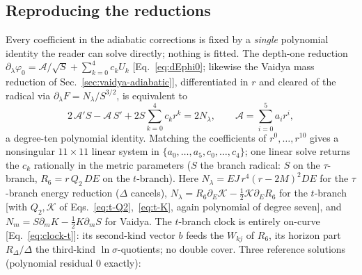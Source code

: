 \documentclass[
    aps, prd, twocolumn, superscriptaddress,
    showpacs, nofootinbib, floatfix
]{revtex4-2}
\begin{document}
\subsection{Reproducing the reductions}
\label{app:reproduce}
Every coefficient in the adiabatic corrections is fixed by a \emph{single}
polynomial identity the reader can solve directly; nothing is fitted. The depth-one
reduction $\partial_\lambda\varphi_0=\mathcal{A}/\sqrt S+\sum_{k=0}^4 c_k U_k$
[Eq.~\eqref{eq:dEphi0}; likewise the Vaidya mass reduction of
Sec.~\ref{sec:vaidya-adiabatic}], differentiated in $r$ and cleared of the radical
via $\partial_\lambda F=N_\lambda/S^{3/2}$, is equivalent to
\begin{equation}
    2\,\mathcal{A}'S-\mathcal{A}\,S'+2S\sum_{k=0}^4 c_k r^k=2N_\lambda,
    \qquad \mathcal{A}=\sum_{i=0}^5 a_i r^i,
    \label{eq:reduction-identity}
\end{equation}
a degree-ten polynomial identity. Matching the coefficients of $r^0,\dots,r^{10}$
gives a nonsingular $11\times11$ linear system in $\{a_0,\dots,a_5,c_0,\dots,c_4\}$;
one linear solve returns the $c_k$ rationally in the metric parameters ($S$ the
branch radical: $S$ on the $\tau$-branch, $R_6=r\,Q_2\,DE$ on the $t$-branch). Here
$N_\lambda=EJ\,r^4(r-2M)^2 DE$ for the $\tau$-branch energy reduction ($\Delta$
cancels), $N_\lambda=R_6\partial_E\mathcal K-\tfrac12\mathcal K\partial_E R_6$ for
the $t$-branch [with $Q_2,\mathcal K$ of Eqs.~\eqref{eq:t-Q2},~\eqref{eq:t-K}, again
polynomial of degree seven], and $N_m=S\partial_m K-\tfrac12K\partial_m S$ for
Vaidya. The $t$-branch clock is entirely on-curve [Eq.~\eqref{eq:clock-t}]: its
second-kind vector $b$ feeds the $W_{kj}$ of $R_6$, its horizon part
$R_\Delta/\Delta$ the third-kind $\ln\sigma$-quotients; no double cover. Three
reference solutions (polynomial residual $0$ exactly):
\end{document}
